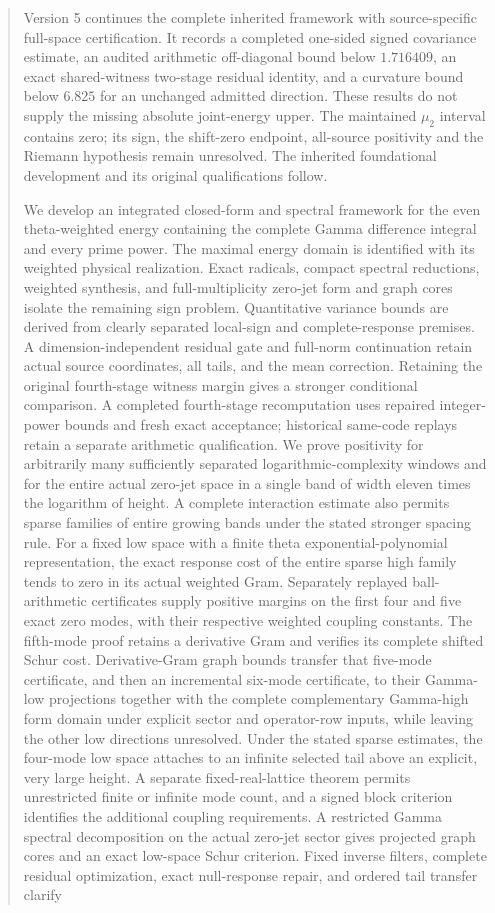 \documentclass[11pt,a4paper]{article}
\numberwithin{equation}{section}
\theoremstyle{definition}\newtheorem{definition}[theorem]{Definition}
\theoremstyle{remark}\newtheorem{remark}[theorem]{Remark}
\begin{document}
\begin{abstract}Version 5 continues the complete inherited framework with source-specific full-space certification. It records a completed one-sided signed covariance estimate, an audited arithmetic off-diagonal bound below $1.716409$, an exact shared-witness two-stage residual identity, and a curvature bound below $6.825$ for an unchanged admitted direction. These results do not supply the missing absolute joint-energy upper. The maintained $\mu_2$ interval contains zero; its sign, the shift-zero endpoint, all-source positivity and the Riemann hypothesis remain unresolved. The inherited foundational development and its original qualifications follow.


We develop an integrated closed-form and spectral framework for the even theta-weighted energy containing the complete Gamma difference integral and every prime power. The maximal energy domain is identified with its weighted physical realization. Exact radicals, compact spectral reductions, weighted synthesis, and full-multiplicity zero-jet form and graph cores isolate the remaining sign problem. Quantitative variance bounds are derived from clearly separated local-sign and complete-response premises. A dimension-independent residual gate and full-norm continuation retain actual source coordinates, all tails, and the mean correction. Retaining the original fourth-stage witness margin gives a stronger conditional comparison. A completed fourth-stage recomputation uses repaired integer-power bounds and fresh exact acceptance; historical same-code replays retain a separate arithmetic qualification. We prove positivity for arbitrarily many sufficiently separated logarithmic-complexity windows and for the entire actual zero-jet space in a single band of width eleven times the logarithm of height. A complete interaction estimate also permits sparse families of entire growing bands under the stated stronger spacing rule. For a fixed low space with a finite theta exponential-polynomial representation, the exact response cost of the entire sparse high family tends to zero in its actual weighted Gram. Separately replayed ball-arithmetic certificates supply positive margins on the first four and five exact zero modes, with their respective weighted coupling constants. The fifth-mode proof retains a derivative Gram and verifies its complete shifted Schur cost. Derivative-Gram graph bounds transfer that five-mode certificate, and then an incremental six-mode certificate, to their Gamma-low projections together with the complete complementary Gamma-high form domain under explicit sector and operator-row inputs, while leaving the other low directions unresolved. Under the stated sparse estimates, the four-mode low space attaches to an infinite selected tail above an explicit, very large height. A separate fixed-real-lattice theorem permits unrestricted finite or infinite mode count, and a signed block criterion identifies the additional coupling requirements. A restricted Gamma spectral decomposition on the actual zero-jet sector gives projected graph cores and an exact low-space Schur criterion. Fixed inverse filters, complete residual optimization, exact null-response repair, and ordered tail transfer clarify 
\end{abstract}
\end{document}
